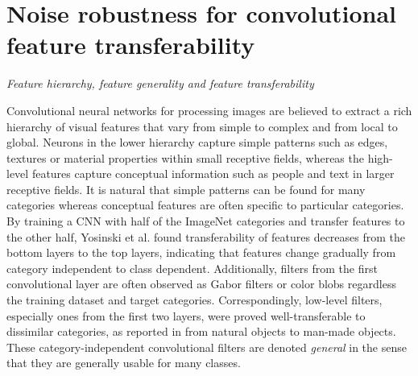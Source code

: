 \section{Noise robustness for convolutional feature transferability}
\label{sec:robustness}


\noindent \textit{Feature hierarchy, feature generality and feature transferability}

Convolutional neural networks for processing images are believed to extract a rich hierarchy of visual features that vary from simple to complex and from local to global.\cite{girshick2014rich}
Neurons in the lower hierarchy capture simple patterns such as edges, textures or material properties within small receptive fields, whereas the high-level features capture conceptual information such as people and text in larger receptive fields.
It is natural that simple patterns can be found for many categories whereas conceptual features are often specific to particular categories.
By training a CNN with half of the ImageNet categories and transfer features to the other half, Yosinski et al.\cite{yosinski2014transferable} found transferability of features decreases from the bottom layers to the top layers, indicating that features change gradually from category independent to class dependent.
Additionally, filters from the first convolutional layer are often observed as Gabor filters or color blobs regardless the training dataset and target categories.\cite{zeiler2014visualizing,lee2009convolutional,krizhevsky2012imagenet,shin2016deep}
Correspondingly, low-level filters, especially ones from the first two layers, were proved well-transferable to dissimilar categories, as reported in \cite{yosinski2014transferable} from natural objects to man-made objects.
These category-independent convolutional filters are denoted \textit{general} in the sense that they are generally usable for many classes.

